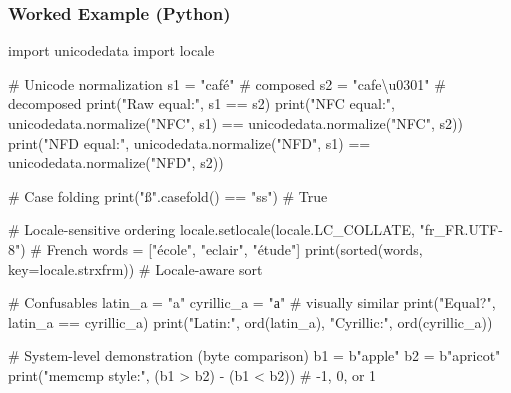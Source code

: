 \documentclass[
  letterpaper,
  DIV=11,
  numbers=noendperiod]{scrreprt}
\newenvironment{Shaded}{\begin{snugshade}}{\end{snugshade}}
\newcommand{\BuiltInTok}[1]{\textcolor[rgb]{0.00,0.23,0.31}{#1}}
\newcommand{\CharTok}[1]{\textcolor[rgb]{0.13,0.47,0.30}{#1}}
\newcommand{\CommentTok}[1]{\textcolor[rgb]{0.37,0.37,0.37}{#1}}
\newcommand{\ImportTok}[1]{\textcolor[rgb]{0.00,0.46,0.62}{#1}}
\newcommand{\NormalTok}[1]{\textcolor[rgb]{0.00,0.23,0.31}{#1}}
\newcommand{\OperatorTok}[1]{\textcolor[rgb]{0.37,0.37,0.37}{#1}}
\newcommand{\StringTok}[1]{\textcolor[rgb]{0.13,0.47,0.30}{#1}}
\begin{document}
\subsubsection{Worked Example (Python)}\label{worked-example-python-12}

\begin{Shaded}
\begin{Highlighting}[]
\ImportTok{import}\NormalTok{ unicodedata}
\ImportTok{import}\NormalTok{ locale}

\CommentTok{\# Unicode normalization}
\NormalTok{s1 }\OperatorTok{=} \StringTok{"café"}          \CommentTok{\# composed}
\NormalTok{s2 }\OperatorTok{=} \StringTok{"cafe}\CharTok{\textbackslash{}u0301}\StringTok{"}    \CommentTok{\# decomposed}
\BuiltInTok{print}\NormalTok{(}\StringTok{"Raw equal:"}\NormalTok{, s1 }\OperatorTok{==}\NormalTok{ s2)}
\BuiltInTok{print}\NormalTok{(}\StringTok{"NFC equal:"}\NormalTok{, unicodedata.normalize(}\StringTok{"NFC"}\NormalTok{, s1) }\OperatorTok{==}\NormalTok{ unicodedata.normalize(}\StringTok{"NFC"}\NormalTok{, s2))}
\BuiltInTok{print}\NormalTok{(}\StringTok{"NFD equal:"}\NormalTok{, unicodedata.normalize(}\StringTok{"NFD"}\NormalTok{, s1) }\OperatorTok{==}\NormalTok{ unicodedata.normalize(}\StringTok{"NFD"}\NormalTok{, s2))}

\CommentTok{\# Case folding}
\BuiltInTok{print}\NormalTok{(}\StringTok{"ß"}\NormalTok{.casefold() }\OperatorTok{==} \StringTok{"ss"}\NormalTok{)   }\CommentTok{\# True}

\CommentTok{\# Locale{-}sensitive ordering}
\NormalTok{locale.setlocale(locale.LC\_COLLATE, }\StringTok{"fr\_FR.UTF{-}8"}\NormalTok{)  }\CommentTok{\# French}
\NormalTok{words }\OperatorTok{=}\NormalTok{ [}\StringTok{"école"}\NormalTok{, }\StringTok{"eclair"}\NormalTok{, }\StringTok{"étude"}\NormalTok{]}
\BuiltInTok{print}\NormalTok{(}\BuiltInTok{sorted}\NormalTok{(words, key}\OperatorTok{=}\NormalTok{locale.strxfrm))  }\CommentTok{\# Locale{-}aware sort}

\CommentTok{\# Confusables}
\NormalTok{latin\_a }\OperatorTok{=} \StringTok{"a"}
\NormalTok{cyrillic\_a }\OperatorTok{=} \StringTok{"а"}  \CommentTok{\# visually similar}
\BuiltInTok{print}\NormalTok{(}\StringTok{"Equal?"}\NormalTok{, latin\_a }\OperatorTok{==}\NormalTok{ cyrillic\_a)}
\BuiltInTok{print}\NormalTok{(}\StringTok{"Latin:"}\NormalTok{, }\BuiltInTok{ord}\NormalTok{(latin\_a), }\StringTok{"Cyrillic:"}\NormalTok{, }\BuiltInTok{ord}\NormalTok{(cyrillic\_a))}

\CommentTok{\# System{-}level demonstration (byte comparison)}
\NormalTok{b1 }\OperatorTok{=} \StringTok{b"apple"}
\NormalTok{b2 }\OperatorTok{=} \StringTok{b"apricot"}
\BuiltInTok{print}\NormalTok{(}\StringTok{"memcmp style:"}\NormalTok{, (b1 }\OperatorTok{\textgreater{}}\NormalTok{ b2) }\OperatorTok{{-}}\NormalTok{ (b1 }\OperatorTok{\textless{}}\NormalTok{ b2))  }\CommentTok{\# {-}1, 0, or 1}
\end{Highlighting}
\end{Shaded}
\end{document}
